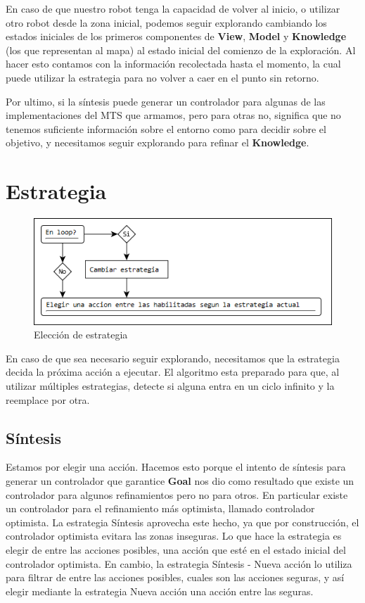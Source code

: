 \vspace{\baselineskip}
En caso de que nuestro robot tenga la capacidad de volver al inicio, o utilizar otro robot desde la zona inicial, podemos seguir explorando cambiando los
estados iniciales de los primeros componentes de \textbf{View}, \textbf{Model} y \textbf{Knowledge} (los que representan al mapa) al estado inicial del comienzo
de la exploración. Al hacer esto contamos con la información recolectada hasta el momento, la cual puede utilizar la estrategia para no volver a caer en el
punto sin retorno.

\vspace{\baselineskip}
Por ultimo, si la síntesis puede generar un controlador para algunas de las implementaciones del MTS que armamos, pero para otras no, significa que no tenemos
suficiente información sobre el entorno como para decidir sobre el objetivo, y necesitamos seguir explorando para refinar el \textbf{Knowledge}.

\section{Estrategia}

\begin{figure}[H]
  \centering
    \includegraphics[width=1.0\textwidth]{Imagenes/Algoritmo/Algoritmo_elegir_1.png}
  \caption{Elección de estrategia}
  \label{fig:Algoritmo_elegir_1}
\end{figure}

En caso de que sea necesario seguir explorando, necesitamos que la estrategia decida la próxima acción a ejecutar. El algoritmo esta preparado para que,
al utilizar múltiples estrategias, detecte si alguna entra en un ciclo infinito y la reemplace por otra.

\subsection{Síntesis}

Estamos por elegir una acción. Hacemos esto porque el intento de síntesis para generar un controlador que garantice \textbf{Goal} nos dio como resultado que
existe un controlador para algunos refinamientos pero no para otros. En particular existe un controlador para el refinamiento más optimista, llamado
controlador optimista. La estrategia Síntesis aprovecha este hecho, ya que por construcción, el controlador optimista evitara las zonas inseguras. Lo que
hace la estrategia es elegir de entre las acciones posibles, una acción que esté en el estado inicial del controlador optimista. En cambio, la estrategia
Síntesis - Nueva acción lo utiliza para filtrar de entre las acciones posibles, cuales son las acciones seguras, y así elegir mediante la estrategia Nueva acción
una acción entre las seguras.

